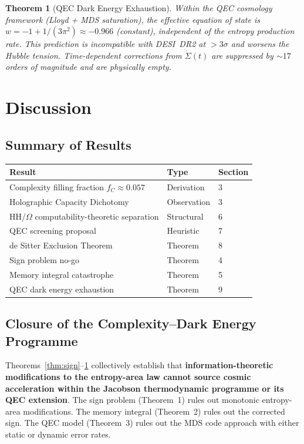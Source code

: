 \documentclass[12pt,a4paper]{article}
\newtheorem{theorem}{Theorem}
\theoremstyle{remark}
\begin{document}
\begin{theorem}[QEC Dark Energy Exhaustion]\label{thm:qec}
Within the QEC cosmology framework (Lloyd + MDS saturation), the effective equation of state is $w = -1+1/(3\pi^2)\approx -0.966$ (constant), independent of the entropy production rate.
This prediction is incompatible with DESI~DR2 at $>3\sigma$ and worsens the Hubble tension.
Time-dependent corrections from $\dot\Sigma(t)$ are suppressed by $\sim 17$ orders of magnitude and are physically empty.
\end{theorem}

\section{Discussion}

\subsection{Summary of Results}

\begin{center}
\begin{tabular}{lll}
\toprule
Result & Type & Section \\
\midrule
Complexity filling fraction $f_C \approx 0.057$ & Derivation & 3 \\
Holographic Capacity Dichotomy & Observation & 3 \\
HH/$\Omega$ computability-theoretic separation & Structural & 6 \\
QEC screening proposal & Heuristic & 7 \\
de Sitter Exclusion Theorem & Theorem & 8 \\
Sign problem no-go & Theorem & 4 \\
Memory integral catastrophe & Theorem & 5 \\
QEC dark energy exhaustion & Theorem & 9 \\
\bottomrule
\end{tabular}
\end{center}

\subsection{Closure of the Complexity--Dark Energy Programme}

Theorems~\ref{thm:sign}--\ref{thm:qec} collectively establish that \textbf{information-theoretic modifications to the entropy-area law cannot source cosmic acceleration within the Jacobson thermodynamic programme or its QEC extension}.
The sign problem (Theorem~1) rules out monotonic entropy-area modifications.
The memory integral (Theorem~2) rules out the corrected sign.
The QEC model (Theorem~3) rules out the MDS code approach with either static or dynamic error rates.
\end{document}
